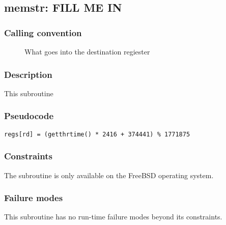 \clearpage
{}
{}
\label{subr:memstr}
\subsection*{memstr: FILL ME IN}

\subsubsection*{Calling convention}

\begin{description}
\item[] What goes into the destination regiester
\end{description}

\subsubsection*{Description}

This subroutine 
\subsubsection*{Pseudocode}

\begin{verbatim}
regs[rd] = (getthrtime() * 2416 + 374441) % 1771875
\end{verbatim}

\subsubsection*{Constraints}

The  subroutine is only available on the FreeBSD operating
system.

\subsubsection*{Failure modes}

This subroutine has no run-time failure modes beyond its constraints.
